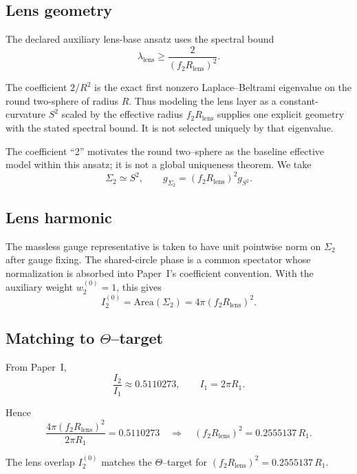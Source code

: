\documentclass[11pt]{article}
\begin{document}
\subsection{Lens geometry}

The declared auxiliary lens-base ansatz uses the spectral bound
\[
\lambda_{\mathrm{lens}} \ge \frac{2}{(f_2R_{\mathrm{lens}})^2}.
\]

\begin{remark}
The coefficient $2/R^2$ is the exact first nonzero Laplace--Beltrami eigenvalue on the round
two-sphere of radius $R$. Thus modeling the lens layer as a constant-curvature $S^2$ scaled by
the effective radius $f_2R_{\mathrm{lens}}$ supplies one explicit geometry
with the stated spectral bound. It is not selected uniquely by that
eigenvalue.
\end{remark}

The coefficient ``2'' motivates the round two--sphere as the baseline
effective model within this ansatz; it is not a global uniqueness theorem. We take
\[
\Sigma_2 \simeq S^2,
\qquad
g_{\Sigma_2} = (f_2R_{\mathrm{lens}})^2 g_{S^2}.
\]

\subsection{Lens harmonic}

The massless gauge representative is taken to have unit pointwise norm on
$\Sigma_2$ after gauge fixing. The shared-circle phase is a common spectator
whose normalization is absorbed into Paper~I's coefficient convention. With
the auxiliary weight $w_2^{(0)}=1$, this gives
\[
I_2^{(0)} = \mathrm{Area}(\Sigma_2) = 4\pi(f_2R_{\mathrm{lens}})^2.
\]

\subsection{Matching to $\Theta$--target}

From Paper~I,
\[
\frac{I_2}{I_1} \approx 0.5110273,
\qquad I_1 = 2\pi R_1.
\]

Hence
\[
\frac{4\pi(f_2R_{\mathrm{lens}})^2}{2\pi R_1} = 0.5110273
\quad\Rightarrow\quad
(f_2R_{\mathrm{lens}})^2 = 0.2555137\,R_1.
\]

\begin{proposition}
The lens overlap $I_2^{(0)}$ matches the $\Theta$--target
for $(f_2R_{\mathrm{lens}})^2 = 0.2555137\,R_1$.
\end{proposition}
\end{document}

